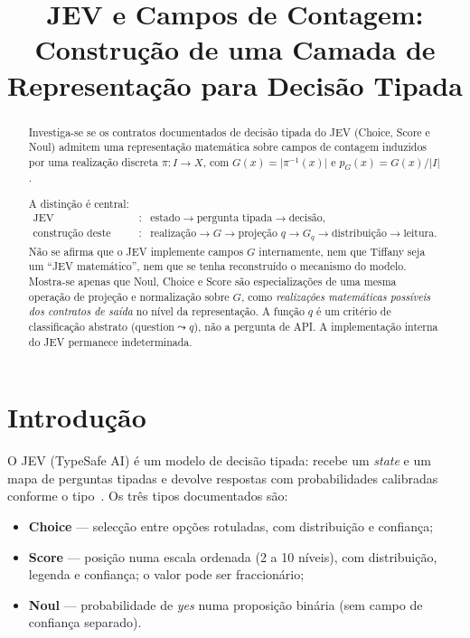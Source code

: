 \documentclass[11pt,a4paper]{article}
\title{JEV e Campos de Contagem:\\
Construção de uma Camada de Representação para Decisão Tipada}
\author{}
\date{}
\begin{document}
\maketitle

\begin{abstract}
\noindent
Investiga-se se os contratos documentados de decisão tipada do JEV
(Choice, Score e Noul) admitem uma representação matemática sobre campos de
contagem induzidos por uma realização discreta
\(\pi\colon I\to X\), com
\(G(x)=\lvert\pi^{-1}(x)\rvert\) e
\(p_G(x)=G(x)/\lvert I\rvert\).

A distinção é central:
\[
\begin{array}{rcl}
\text{JEV} &\colon&
\text{estado}\to\text{pergunta tipada}\to\text{decisão},\\[2pt]
\text{construção deste paper} &\colon&
\text{realização}\to G\to\text{projeção }q\to G_q\to\text{distribuição}\to\text{leitura}.
\end{array}
\]
Não se afirma que o JEV implemente campos \(G\) internamente, nem que Tiffany
seja um ``JEV matemático'', nem que se tenha reconstruído o mecanismo do
modelo. Mostra-se apenas que Noul, Choice e Score são especializações de uma
mesma operação de projeção e normalização sobre \(G\), como
\emph{realizações matemáticas possíveis dos contratos de saída} no nível da
representação. A função \(q\) é um critério de classificação abstrato
(\(\text{question}\leadsto q\)), não a pergunta de API. A implementação
interna do JEV permanece indeterminada.
\end{abstract}

\tableofcontents
\newpage

\section{Introdução}

O JEV (TypeSafe AI) é um modelo de decisão tipada: recebe um \emph{state} e um
mapa de perguntas tipadas e devolve respostas com probabilidades calibradas
conforme o tipo~\cite{typesafe-docs,jev-docs,systemone-primitives}. Os três
tipos documentados são:
\begin{itemize}[leftmargin=1.5em]
\item \textbf{Choice} --- selecção entre opções rotuladas, com distribuição e
confiança;
\item \textbf{Score} --- posição numa escala ordenada (2 a 10 níveis), com
distribuição, legenda e confiança; o valor pode ser fraccionário;
\item \textbf{Noul} --- probabilidade de \emph{yes} numa proposição binária
(sem campo de confiança separado).
\end{itemize}
\end{document}
